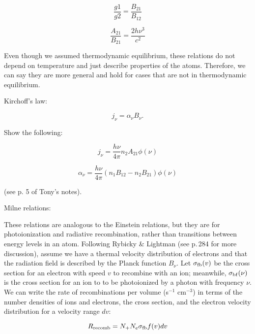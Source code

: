 \begin{enumerate}
      \begin{equation}
      \frac{g1}{g2} = \frac{B_{21}}{B_{12}}
      \end{equation}
      
      \begin{equation}
      \frac{A_{21}}{B_{21}} = \frac{2 h \nu^3}{c^2}
      \end{equation}
      
      Even though we assumed thermodynamic equilibrium, these relations do not depend on temperature and just describe properties of the atoms. Therefore, we can say they are more general and hold for cases that are not in thermodynamic equilibrium.
      
      Kirchoff's law:
      
      \begin{equation}
      j_\nu = \alpha_\nu B_\nu.
      \end{equation}
      
      Show the following:
      
      \begin{equation}
      j_\nu = \frac{h \nu}{4 \pi} n_2 A_{21} \phi(\nu)
      \end{equation}
      
       \begin{equation}
      \alpha_\nu = \frac{h \nu}{4 \pi} (n_1 B_{12} - n_2 B_{21} ) \phi(\nu)
      \end{equation}
      
      (see p. 5 of Tony's notes). 
      
      Milne relations:
      
      These relations are analogous to the Einstein relations, but they are for photoionization and radiative recombination, rather than transitions between energy levels in an atom. Following Rybicky \& Lightman (see p.\,284 for more discussion), assume we have a thermal velocity distribution of electrons and that the radiation field is described by the Planck function $B_\nu$. Let $\sigma_{\rm fb}(v)$ be the cross section for an electron with speed $v$ to recombine with an ion; meanwhile, $\sigma_{\rm bf}(\nu)$ is the cross section for an ion to to be photoionized by a photon with frequency $\nu$. We can write the rate of recombinations per volume (s$^{-1}$ cm$^{-3}$) in terms of the number densities of ions and electrons, the cross section, and the electron velocity distribution for a velocity range $dv$:
      
      \begin{equation}
      R_{\rm recomb} = N_+N_e \sigma_{\rm fb} f(v) dv
      \end{equation}
      

\end{enumerate}
